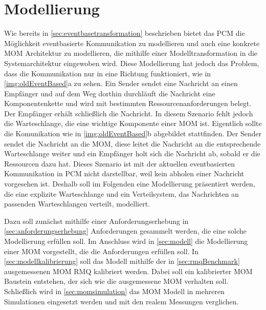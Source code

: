 
\chapter{Modellierung}
\label{ch:modellierung}
Wie bereits in \autoref{sec:eventbasetransformation} beschrieben bietet das PCM die Möglichkeit eventbasierte Kommunikation zu modellieren und auch eine konkrete MOM Architektur zu modellieren, die mithilfe einer Modelltransformation in die Systemarchitektur eingewoben wird. Diese Modellierung hat jedoch das Problem, dass die Kommunikation nur in eine Richtung funktioniert, wie in \autoref{img:oldEventBased}a zu sehen. Ein Sender sendet eine Nachricht an einen Empfänger und auf dem Weg dorthin durchläuft die Nachricht eine Komponentenkette und wird mit bestimmten Ressourcenanforderungen belegt. Der Empfänger erhält schließlich die Nachricht. In diesem Szenario fehlt jedoch die Warteschlange, die eine wichtige Komponente einer MOM ist. Eigentlich sollte die Komunikation wie in \autoref{img:oldEventBased}b abgebildet stattfinden. Der Sender sendet die Nachricht an die MOM, diese leitet die Nachricht an die entsprechende Warteschlange weiter und ein Empfänger holt sich die Nachricht ab, sobald er die Ressourcen dazu hat. Dieses Szenario ist mit der aktuellen eventbasierten Kommunikation in PCM nicht darstellbar, weil kein abholen einer Nachricht vorgesehen ist. Deshalb soll im Folgenden eine Modellierung präsentiert werden, die eine explizite Warteschlange und ein Verteilsystem, das Nachrichten an passenden Warteschlangen verteilt, modelliert.\par
Dazu soll zunächst mithilfe einer Anforderungserhebung in \autoref{sec:anforderungserhebung} Anforderungen gesammelt werden, die eine solche Modellierung erfüllen soll. Im Anschluss wird in \autoref{sec:modell} die Modellierung einer MOM vorgestellt, die die Anforderungen erfüllen soll. In \autoref{sec:modellkalibrierung} soll das Modell mithilfe der in \autoref{sec:rmqBenchmark} ausgemessenen MOM RMQ kalibriert werden. Dabei soll ein kalibrierter MOM Baustein entstehen, der sich wie die ausgemessene MOM verhalten soll. Schließlich wird in \autoref{sec:momsimulation} das MOM Modell in mehreren Simulationen eingesetzt werden und mit den realem Messungen verglichen. 
